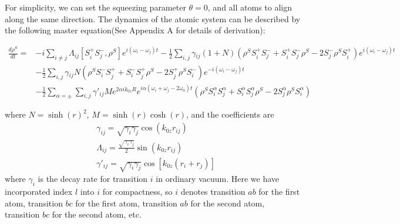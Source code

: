 \documentclass[aps,showpacs,twocolumn,twoside,groupedaddress]{revtex4}
\begin{document}
For simplicity, we can set the squeezing parameter $\theta=0$, and all atoms to align along the same direction. The dynamics of the atomic system can be described by the following master equation(See Appendix A for details of derivation):
\begin{widetext}
\begin{equation}
\label{eq1}
\begin{split}
\frac{d\rho^{S}}{dt}=&-i\underset{i\neq j}{\sum}\Lambda_{ij}[S_{i}^{+}S_{j}^{-},\rho^{S}]e^{i(\omega_{i}-\omega_{j})t}-\frac{1}{2}\underset{i,j}{\sum}\gamma{}_{ij}(1+N)(\rho^{S}S_{i}^{+}S_{j}^{-}+S_{i}^{+}S_{j}^{-}\rho^{S}-2S_{j}^{-}\rho^{S}S_{i}^{+})e^{i(\omega_{i}-\omega_{j})t} \\
&-\frac{1}{2}\underset{i,j}{\sum}\gamma{}_{ij}N(\rho^{S}S_{i}^{-}S_{j}^{+}+S_{i}^{-}S_{j}^{+}\rho^{S}-2S_{j}^{+}\rho^{S}S_{i}^{-})e^{-i(\omega_{i}-\omega_{j})t}\\
&-\frac{1}{2}\sum_{\alpha=\pm}\underset{i,j}{\sum}\gamma'_{ij}Me^{2\alpha ik_{0z}R}e^{i\alpha(\omega_i+\omega_j-2\omega_0)t}(\rho^{S}S_{i}^{\alpha}S_{j}^{\alpha}+S_{i}^{\alpha}S_{j}^{\alpha}\rho^{S}-2S_{j}^{\alpha}\rho^{S}S_{i}^{\alpha})
\end{split}
\end{equation}
\end{widetext}
where $N=\sinh(r)^2$, $M=\sinh(r)\cosh(r)$, and the coefficients are
\begin{equation}
\label{eq2}
\begin{split}
& \gamma_{ij}=\sqrt{\gamma_{i}\gamma_{j}}\cos(k_{0z}r_{ij}) \\
& \Lambda_{ij}=\frac{\sqrt{\gamma_{i}\gamma_{j}}}{2}\sin(k_{0z}r_{ij})\\
& \gamma'_{ij}=\sqrt{\gamma_{i}\gamma_{j}}\cos[k_{0z}(r_{i}+r_{j})]
\end{split}
\end{equation}
where $\gamma_{i}$ is the decay rate for transition $i$ in ordinary vacuum. Here we have incorporated index $l$ into $i$ for compactness, so $i$ denotes transition $ab$ for the first atom, transition $bc$ for the first atom, transition $ab$ for the second atom, transition $bc$ for the second atom, etc.
\end{document}
